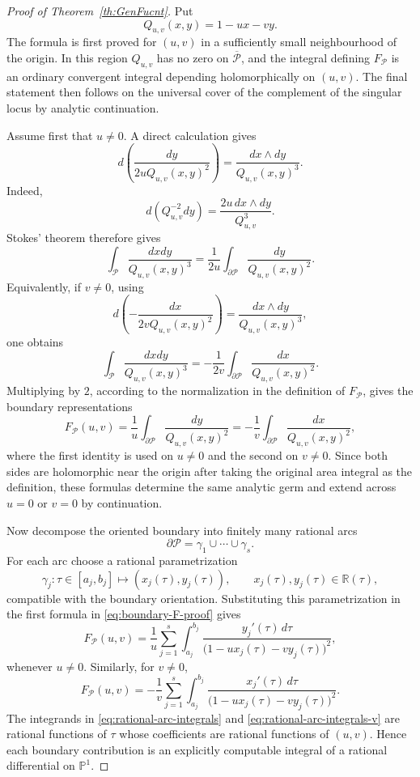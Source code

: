 \documentclass[10pt,a4paper,reqno]{amsart}
\newcommand {\bR} {\mathbb R}
\newcommand {\bP} {\mathbb {P}}
\newcommand {\cP} {\mathcal P}
\theoremstyle{plain}
\theoremstyle{definition}
\begin{document}
\begin{proof}[Proof of Theorem~\ref{th:GenFucnt}]
Put
\[
        Q_{u,v}(x,y)=1-ux-vy.
\]
The formula is first proved for $(u,v)$ in a sufficiently small neighbourhood of the origin.  In this region $Q_{u,v}$ has no zero on $\overline{\cP}$, and the integral defining $F_{\cP}$ is an ordinary convergent integral depending holomorphically on $(u,v)$.  The final statement then follows on the universal cover of the complement of the singular locus by analytic continuation.

Assume first that $u\ne 0$.  A direct calculation gives
\[
   d\left(\frac{dy}{2uQ_{u,v}(x,y)^2}\right)
       =\frac{dx\wedge dy}{Q_{u,v}(x,y)^3}.
\]
Indeed,
\[
 d\left(Q_{u,v}^{-2}dy\right)
 =\frac{2u\,dx\wedge dy}{Q_{u,v}^{3}}.
\]
Stokes' theorem therefore gives
\[
  \int_{\cP}\frac{dxdy}{Q_{u,v}(x,y)^3}
   =\frac{1}{2u}\int_{\partial\cP}\frac{dy}{Q_{u,v}(x,y)^2}.
\]
Equivalently, if $v\ne0$, using
\[
   d\left(-\frac{dx}{2vQ_{u,v}(x,y)^2}\right)
       =\frac{dx\wedge dy}{Q_{u,v}(x,y)^3},
\]
one obtains
\[
  \int_{\cP}\frac{dxdy}{Q_{u,v}(x,y)^3}
   =-\frac{1}{2v}\int_{\partial\cP}\frac{dx}{Q_{u,v}(x,y)^2}.
\]
Multiplying by $2$, according to the normalization in the definition of $F_{\cP}$, gives the boundary representations
\begin{equation}\label{eq:boundary-F-proof}
 F_{\cP}(u,v)=\frac{1}{u}\int_{\partial\cP}\frac{dy}{Q_{u,v}(x,y)^2}
              =-\frac{1}{v}\int_{\partial\cP}\frac{dx}{Q_{u,v}(x,y)^2},
\end{equation}
where the first identity is used on $u\ne0$ and the second on $v\ne0$.  Since both sides are holomorphic near the origin after taking the original area integral as the definition, these formulas determine the same analytic germ and extend across $u=0$ or $v=0$ by continuation.

Now decompose the oriented boundary into finitely many rational arcs
\[
        \partial\cP=\gamma_1\cup\cdots\cup\gamma_s.
\]
For each arc choose a rational parametrization
\[
        \gamma_j:\tau\in [a_j,b_j]\longmapsto (x_j(\tau),y_j(\tau)),
        \qquad x_j(\tau),y_j(\tau)\in\bR(\tau),
\]
compatible with the boundary orientation.  Substituting this parametrization in the first formula in \eqref{eq:boundary-F-proof} gives
\begin{equation}\label{eq:rational-arc-integrals}
 F_{\cP}(u,v)=\frac{1}{u}
       \sum_{j=1}^s\int_{a_j}^{b_j}
       \frac{y_j'(\tau)\,d\tau}
       {\bigl(1-u x_j(\tau)-v y_j(\tau)\bigr)^2},
\end{equation}
whenever $u\ne0$.  Similarly, for $v\ne0$,
\begin{equation}\label{eq:rational-arc-integrals-v}
 F_{\cP}(u,v)=-\frac{1}{v}
       \sum_{j=1}^s\int_{a_j}^{b_j}
       \frac{x_j'(\tau)\,d\tau}
       {\bigl(1-u x_j(\tau)-v y_j(\tau)\bigr)^2}.
\end{equation}
The integrands in \eqref{eq:rational-arc-integrals} and \eqref{eq:rational-arc-integrals-v} are rational functions of $\tau$ whose coefficients are rational functions of $(u,v)$.  Hence each boundary contribution is an explicitly computable integral of a rational differential on $\bP^1$.


\end{proof}
\end{document}
